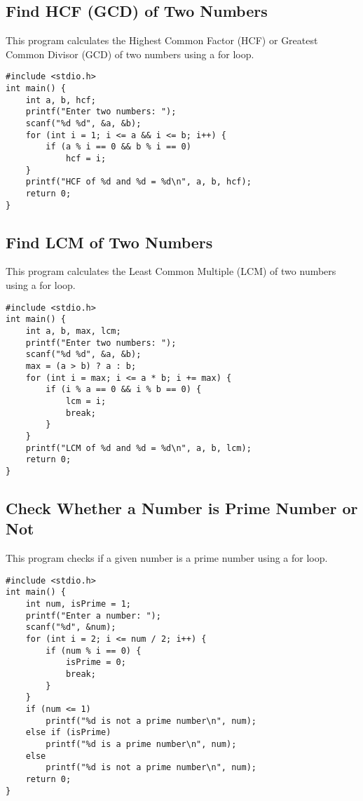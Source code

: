 \documentclass[a4paper,12pt]{article}
\begin{document}
\newpage

\subsection{Find HCF (GCD) of Two Numbers}
This program calculates the Highest Common Factor (HCF) or Greatest Common Divisor (GCD) of two numbers using a for loop.

\begin{lstlisting}[caption={Find HCF (GCD) of Two Numbers}]
#include <stdio.h>
int main() {
    int a, b, hcf;
    printf("Enter two numbers: ");
    scanf("%d %d", &a, &b);
    for (int i = 1; i <= a && i <= b; i++) {
        if (a % i == 0 && b % i == 0)
            hcf = i;
    }
    printf("HCF of %d and %d = %d\n", a, b, hcf);
    return 0;
}
\end{lstlisting}

\newpage

\subsection{Find LCM of Two Numbers}
This program calculates the Least Common Multiple (LCM) of two numbers using a for loop.

\begin{lstlisting}[caption={Find LCM of Two Numbers}]
#include <stdio.h>
int main() {
    int a, b, max, lcm;
    printf("Enter two numbers: ");
    scanf("%d %d", &a, &b);
    max = (a > b) ? a : b;
    for (int i = max; i <= a * b; i += max) {
        if (i % a == 0 && i % b == 0) {
            lcm = i;
            break;
        }
    }
    printf("LCM of %d and %d = %d\n", a, b, lcm);
    return 0;
}
\end{lstlisting}

\newpage

\subsection{Check Whether a Number is Prime Number or Not}
This program checks if a given number is a prime number using a for loop.

\begin{lstlisting}[caption={Check Whether a Number is Prime Number or Not}]
#include <stdio.h>
int main() {
    int num, isPrime = 1;
    printf("Enter a number: ");
    scanf("%d", &num);
    for (int i = 2; i <= num / 2; i++) {
        if (num % i == 0) {
            isPrime = 0;
            break;
        }
    }
    if (num <= 1)
        printf("%d is not a prime number\n", num);
    else if (isPrime)
        printf("%d is a prime number\n", num);
    else
        printf("%d is not a prime number\n", num);
    return 0;
}
\end{lstlisting}
\end{document}
